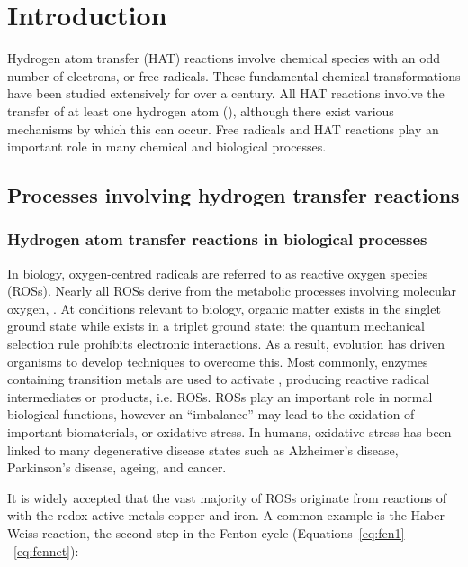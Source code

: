 
\chapter{Introduction}

Hydrogen atom transfer (HAT) reactions involve chemical species with an odd
number of electrons, or free radicals. These fundamental chemical
transformations have been studied extensively for over a
century.\cite{Kochi1973,Parsons2000} All HAT reactions involve the transfer of
at least one hydrogen atom (), although there exist various mechanisms
by which this can occur. Free radicals and HAT reactions play an important role
in many chemical and biological processes.\cite{Halliwell2015}

\section{Processes involving hydrogen transfer reactions}

\subsection{Hydrogen atom transfer reactions in biological processes}

In biology, oxygen-centred radicals are referred to as reactive oxygen species
(ROSs). Nearly all ROSs derive from the metabolic processes involving molecular
oxygen, .\cite{Barnham2004} At conditions relevant to biology, organic
matter exists in the singlet ground state while  exists in a triplet
ground state: the quantum mechanical selection rule prohibits electronic
interactions. As a result, evolution has driven organisms to develop techniques
to overcome this. Most commonly, enzymes containing transition metals are used
to activate , producing reactive radical intermediates or products,
i.e. ROSs. ROSs play an important role in normal biological functions, however
an ``imbalance'' may lead to the oxidation of important biomaterials, or
oxidative stress.\cite{Halliwell2015} In humans, oxidative stress has been
linked to many degenerative disease states such as Alzheimer's
disease,\cite{Barnham2004,Valko2007} Parkinson's disease,\cite{Hwang2013}
ageing, and cancer.\cite{Halliwell2007}

It is widely accepted that the vast majority of ROSs originate from reactions of
 with the redox-active metals copper and iron.\cite{Halliwell2015} A
common example is the Haber-Weiss reaction, the second step in the Fenton cycle
(Equations~\ref{eq:fen1}~--~\ref{eq:fennet}):

